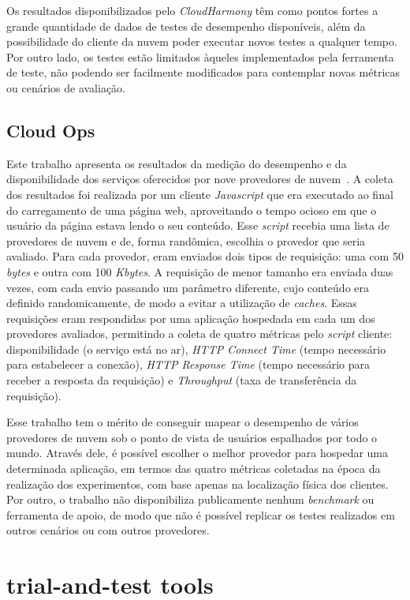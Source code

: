 Os resultados disponibilizados pelo {\em CloudHarmony} têm como pontos fortes a
grande quantidade de dados de testes de desempenho disponíveis, além da possibilidade do cliente da
nuvem poder executar novos testes a qualquer tempo. Por outro lado, os testes estão limitados àqueles implementados pela ferramenta de teste, não podendo ser facilmente modificados para contemplar novas métricas ou cenários de avaliação.

\subsection{Cloud Ops}
Este trabalho apresenta os resultados da medição do desempenho e da disponibilidade
dos serviços oferecidos por nove provedores de nuvem~\cite{cloudops}.  A coleta dos resultados foi realizada por um cliente {\em Javascript} que era executado ao final do carregamento de uma página web, aproveitando o tempo ocioso em que o usuário da página estava lendo o seu conteúdo. Esse {\em script} recebia uma
lista de provedores de nuvem e de, forma randômica, escolhia o provedor que seria
avaliado. Para cada provedor, eram enviados dois tipos de requisição: uma com 50
{\em bytes} e outra com 100 {\em Kbytes}. A requisição de menor tamanho era
enviada duas vezes, com cada envio passando um parâmetro diferente, cujo conteúdo era definido randomicamente, de modo a evitar a utilização de {\em caches}. Essas requisições
eram respondidas por uma aplicação hospedada em cada um dos provedores avaliados, permitindo a coleta de quatro métricas pelo {\em script} cliente: disponibilidade (o serviço está no ar), {\em HTTP Connect
Time} (tempo necessário para estabelecer a conexão), {\em HTTP Response Time} (tempo
necessário para receber a resposta da requisição) e {\em Throughput} (taxa de
transferência da requisição).

Esse trabalho tem o mérito de conseguir mapear o desempenho de vários provedores de nuvem sob o ponto de
vista de usuários espalhados por todo o mundo. Através dele, é possível escolher o melhor provedor para hospedar uma determinada aplicação, em termos das quatro métricas coletadas na época da realização dos experimentos, com base apenas na localização física dos clientes. Por outro, o trabalho não disponibiliza publicamente nenhum {\em benchmark} ou ferramenta de apoio, de modo que não é possível replicar os testes realizados em outros cenários ou com outros provedores. 

\section{trial-and-test tools}
